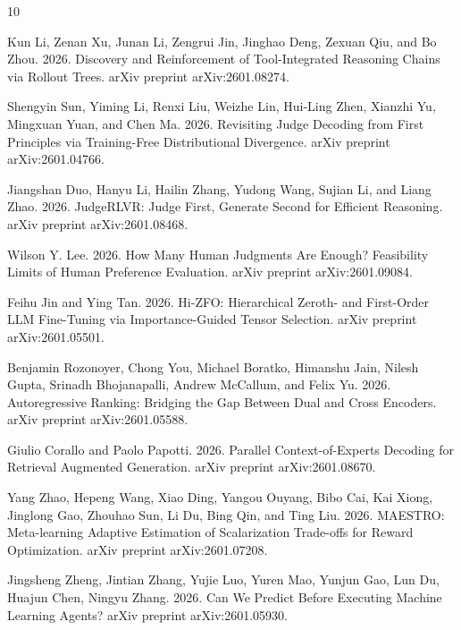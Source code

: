 \documentclass{article}
\begin{document}
\begin{thebibliography}{10}

Kun Li, Zenan Xu, Junan Li, Zengrui Jin, Jinghao Deng, Zexuan Qiu, and Bo Zhou. 2026. Discovery and Reinforcement of Tool-Integrated Reasoning Chains via Rollout Trees. arXiv preprint arXiv:2601.08274.

Shengyin Sun, Yiming Li, Renxi Liu, Weizhe Lin, Hui-Ling Zhen, Xianzhi Yu, Mingxuan Yuan, and Chen Ma. 2026. Revisiting Judge Decoding from First Principles via Training-Free Distributional Divergence. arXiv preprint arXiv:2601.04766.

Jiangshan Duo, Hanyu Li, Hailin Zhang, Yudong Wang, Sujian Li, and Liang Zhao. 2026. JudgeRLVR: Judge First, Generate Second for Efficient Reasoning. arXiv preprint arXiv:2601.08468.

Wilson Y. Lee. 2026. How Many Human Judgments Are Enough? Feasibility Limits of Human Preference Evaluation. arXiv preprint arXiv:2601.09084.

Feihu Jin and Ying Tan. 2026. Hi-ZFO: Hierarchical Zeroth- and First-Order LLM Fine-Tuning via Importance-Guided Tensor Selection. arXiv preprint arXiv:2601.05501.

Benjamin Rozonoyer, Chong You, Michael Boratko, Himanshu Jain, Nilesh Gupta, Srinadh Bhojanapalli, Andrew McCallum, and Felix Yu. 2026. Autoregressive Ranking: Bridging the Gap Between Dual and Cross Encoders. arXiv preprint arXiv:2601.05588.

Giulio Corallo and Paolo Papotti. 2026. Parallel Context-of-Experts Decoding for Retrieval Augmented Generation. arXiv preprint arXiv:2601.08670.

Yang Zhao, Hepeng Wang, Xiao Ding, Yangou Ouyang, Bibo Cai, Kai Xiong, Jinglong Gao, Zhouhao Sun, Li Du, Bing Qin, and Ting Liu. 2026. MAESTRO: Meta-learning Adaptive Estimation of Scalarization Trade-offs for Reward Optimization. arXiv preprint arXiv:2601.07208.

Jingsheng Zheng, Jintian Zhang, Yujie Luo, Yuren Mao, Yunjun Gao, Lun Du, Huajun Chen, Ningyu Zhang. 2026. Can We Predict Before Executing Machine Learning Agents? arXiv preprint arXiv:2601.05930.


\end{thebibliography}
\end{document}
